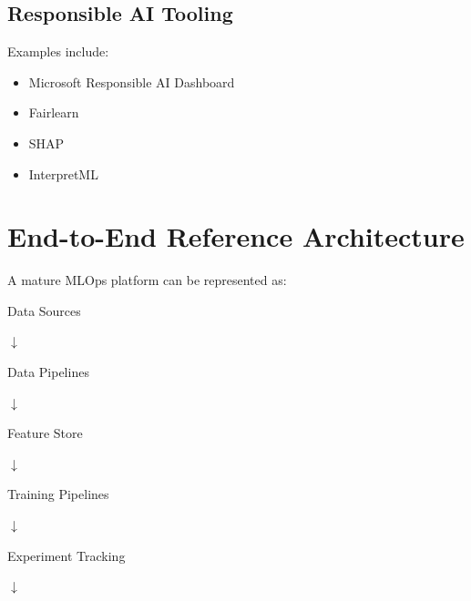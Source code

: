 \subsection{Responsible AI Tooling}

Examples include:

\begin{itemize}
    \item Microsoft Responsible AI Dashboard
    \item Fairlearn
    \item SHAP
    \item InterpretML
\end{itemize}

\section{End-to-End Reference Architecture}

A mature MLOps platform can be represented as:

\begin{center}
Data Sources
\end{center}

\begin{center}
$\downarrow$
\end{center}

\begin{center}
Data Pipelines
\end{center}

\begin{center}
$\downarrow$
\end{center}

\begin{center}
Feature Store
\end{center}

\begin{center}
$\downarrow$
\end{center}

\begin{center}
Training Pipelines
\end{center}

\begin{center}
$\downarrow$
\end{center}

\begin{center}
Experiment Tracking
\end{center}

\begin{center}
$\downarrow$
\end{center}

